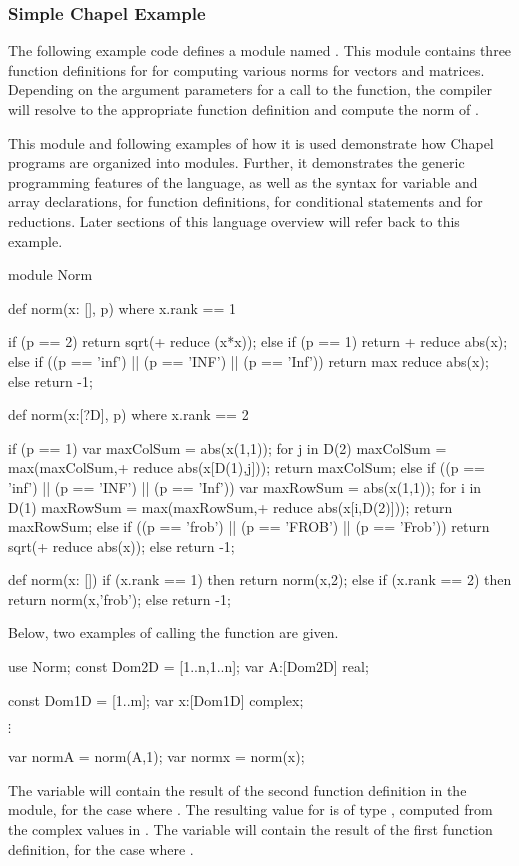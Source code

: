 \subsubsection{Simple Chapel Example}
\label{Simple_Chapel_Example}
The following example code defines a module named .
This module contains three function definitions for 
for computing various norms for vectors and matrices.  Depending
on the argument parameters for a call to the  function,
the compiler will resolve to the appropriate function definition
and compute the norm of .

This module and following examples of how it is used demonstrate
how Chapel programs are organized into modules.  Further, it demonstrates
the generic programming features of the language, as well as the syntax
for variable and array declarations, for function definitions, for 
conditional statements and for reductions.  Later sections of
this language overview will refer back to this example.

\begin{chapel}
module Norm{
  def norm(x: [], p) where x.rank == 1 {

    if (p == 2) {
      return sqrt(+ reduce (x*x));
    } else if (p == 1) {
      return + reduce abs(x);
    } else if ((p == 'inf') || (p == 'INF') || (p == 'Inf')) {
      return max reduce abs(x);
    } else return -1;
  }

  def norm(x:[?D], p) where x.rank == 2 {

    if (p == 1) {
      var maxColSum = abs(x(1,1));
      for j in D(2) {
        maxColSum = max(maxColSum,+ reduce abs(x[D(1),j]));
      }
      return maxColSum;
    } else if ((p == 'inf') || (p == 'INF') || (p == 'Inf')) {
      var maxRowSum = abs(x(1,1));
      for i in D(1) {
        maxRowSum = max(maxRowSum,+ reduce abs(x[i,D(2)]));
      }
      return maxRowSum;
    } else if ((p == 'frob') || (p == 'FROB') || (p == 'Frob')) {
      return sqrt(+ reduce abs(x));
    } else return -1;
  }

  def norm(x: []) {
    if (x.rank == 1) then return norm(x,2);
    else if (x.rank == 2) then return norm(x,'frob');
    else return -1;
  }
}
\end{chapel}

Below, two examples of calling the  function are given.
\begin{chapel}
use Norm;
const Dom2D = [1..n,1..n];
var A:[Dom2D] real;

const Dom1D = [1..m];
var x:[Dom1D] complex;

$\vdots$

var normA = norm(A,1);
var normx = norm(x);
\end{chapel}
The variable  will contain the result of the second
 function definition in the  module, for the
case where .  The resulting value for  is
of type , computed from the complex values in .
The variable  will contain
the  result of the first  function definition, for
the case where .


